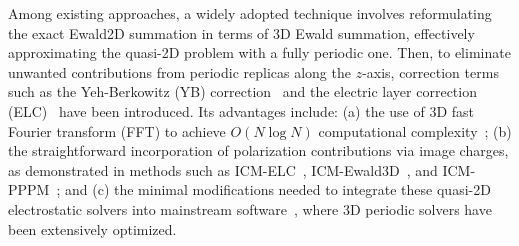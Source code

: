 Among existing approaches, a widely adopted technique involves reformulating the exact Ewald2D summation in terms of 3D Ewald summation, effectively approximating the quasi-2D problem with a fully periodic one.
Then, to eliminate unwanted contributions from periodic replicas along the $z$-axis, correction terms such as the Yeh-Berkowitz (YB) correction~\cite{yeh1999ewald,dos2015electrolytes} and the electric layer correction (ELC)~\cite{arnold2002electrostatics,tyagi2008electrostatic} have been introduced.
Its advantages include: (a) the use of 3D fast Fourier transform (FFT) to achieve $ O(N\log N)$ computational complexity~\cite{yuan2021particle,huang2024pmc}; 
(b) the straightforward incorporation of polarization contributions via image charges, as demonstrated in methods such as ICM-ELC~\cite{tyagi2008electrostatic}, ICM-Ewald3D~\cite{dos2015electrolytes}, and ICM-PPPM~\cite{yuan2021particle}; 
and (c) the minimal modifications needed to integrate these quasi-2D electrostatic solvers into mainstream software~\cite{ABRAHAM201519,thompson2021lammps}, where 3D periodic solvers have been extensively optimized.



